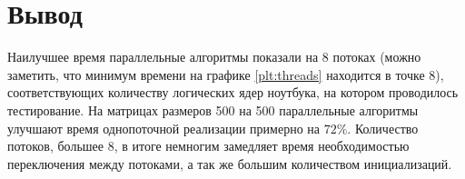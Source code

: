 \clearpage

\section*{Вывод}

Наилучшее время параллельные алгоритмы показали на 8 потоках (можно заметить, что минимум времени на графике \ref{plt:threads} находится в точке 8), соответствующих количеству логических ядер ноутбука, на котором проводилось тестирование. На матрицах размеров 500 на 500 параллельные алгоритмы улучшают время однопоточной реализации примерно на $72\%$.
Количество потоков, большее 8, в итоге немногим замедляет время необходимостью переключения между потоками, а так же большим количеством инициализаций.
